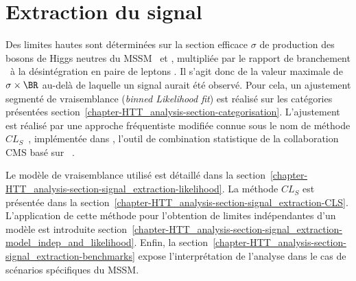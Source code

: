 \section{Extraction du signal}\label{chapter-HTT_analysis-section-signal_extraction}
Des limites hautes sont déterminées sur la section efficace $\sigma$ de production des bosons de Higgs neutres du MSSM \Higgs\ et \HiggsA, multipliée par le rapport de branchement \BR\ à la désintégration en paire de leptons \tau.
Il s'agit donc de la valeur maximale de $\sigma\times\BR$ au-delà de laquelle un signal aurait été observé.
Pour cela, un ajustement segmenté de vraisemblance (\emph{binned Likelihood fit}) est réalisé sur les catégories présentées section~\ref{chapter-HTT_analysis-section-categorisation}.
L'ajustement est réalisé par une approche fréquentiste modifiée connue sous le nom de méthode $CL_S$~\cite{Junk:1999kv,CLs_method,Read_2002}, implémentée dans \COMBINE, l'outil de combination statistique de la collaboration CMS basé sur \ROOSTATS~\cite{RooStats}.
\par
Le modèle de vraisemblance utilisé est détaillé dans la section~\ref{chapter-HTT_analysis-section-signal_extraction-likelihood}.
La méthode $CL_S$ est présentée dans la section~\ref{chapter-HTT_analysis-section-signal_extraction-CLS}.
L'application de cette méthode pour l'obtention de limites indépendantes d'un modèle est introduite section~\ref{chapter-HTT_analysis-section-signal_extraction-model_indep_and_likelihood}.
Enfin, la section~\ref{chapter-HTT_analysis-section-signal_extraction-benchmarks} expose l'interprétation de l'analyse dans le cas de scénarios spécifiques du MSSM.





